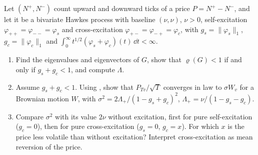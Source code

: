 \begin{exercise}\label{ex:hk-price-variance}
\medium Let $(N^+,N^-)$ count upward and downward ticks of a price $P=N^+-N^-$, and let it be a bivariate Hawkes
process with baseline $(\nu,\nu)$, $\nu>0$, self-excitation $\varphi_{++}=\varphi_{--}=\varphi_s$ and
cross-excitation $\varphi_{+-}=\varphi_{-+}=\varphi_c$, with $g_s=\|\varphi_s\|_1$, $g_c=\|\varphi_c\|_1$ and
$\int_0^\infty t^{1/2}(\varphi_s+\varphi_c)(t)\,\dd t<\infty$.
\begin{enumerate}[label=(\alph*)]
  \item Find the eigenvalues and eigenvectors of $G$, show that $\varrho(G)<1$ if and only if $g_s+g_c<1$, and
    compute $\Lambda$.
  \item Assume $g_s+g_c<1$. Using , show that $P_{Tv}/\sqrt T$ converges in law to $\sigma W_v$ for
    a Brownian motion $W$, with $\sigma^2=2\Lambda_+/(1-g_s+g_c)^2$, $\Lambda_+=\nu/(1-g_s-g_c)$.
  \item Compare $\sigma^2$ with its value $2\nu$ without excitation, first for pure self-excitation ($g_c=0$), then for
    pure cross-excitation ($g_s=0$, $g_c=x$). For which $x$ is the price less volatile than without excitation?
    Interpret cross-excitation as mean reversion of the price.
\end{enumerate}
\end{exercise}

